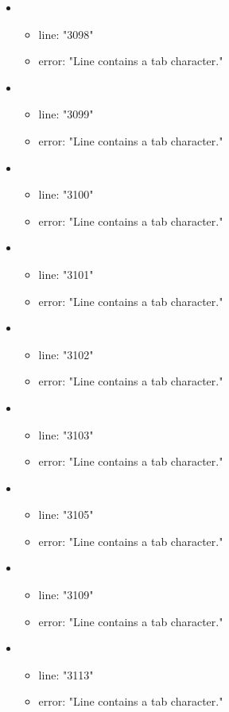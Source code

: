 \begin{itemize}
\begin{itemize}
	\end{itemize}
	\item 
	\begin{itemize} 
		\item line: "3098" 
		\item error: "Line contains a tab character." 
	\end{itemize}
	\item 
	\begin{itemize} 
		\item line: "3099" 
		\item error: "Line contains a tab character." 
	\end{itemize}
	\item 
	\begin{itemize} 
		\item line: "3100" 
		\item error: "Line contains a tab character." 
	\end{itemize}
	\item 
	\begin{itemize} 
		\item line: "3101" 
		\item error: "Line contains a tab character." 
	\end{itemize}
	\item 
	\begin{itemize} 
		\item line: "3102" 
		\item error: "Line contains a tab character." 
	\end{itemize}
	\item 
	\begin{itemize} 
		\item line: "3103" 
		\item error: "Line contains a tab character." 
	\end{itemize}
	\item 
	\begin{itemize} 
		\item line: "3105" 
		\item error: "Line contains a tab character." 
	\end{itemize}
	\item 
	\begin{itemize} 
		\item line: "3109" 
		\item error: "Line contains a tab character." 
	\end{itemize}
	\item 
	\begin{itemize} 
		\item line: "3113" 
		\item error: "Line contains a tab character." 
	\end{itemize}

\end{itemize}
